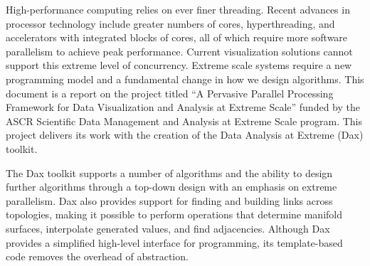 
High-performance computing relies on ever finer threading. Recent advances
in processor technology include greater numbers of cores, hyperthreading,
and accelerators with integrated blocks of cores, all of which require more
software parallelism to achieve peak performance. Current visualization
solutions cannot support this extreme level of concurrency. Extreme scale
systems require a new programming model and a fundamental change in how we
design algorithms. This document is a report on the project titled ``A
Pervasive Parallel Processing Framework for Data Visualization and Analysis
at Extreme Scale'' funded by the ASCR Scientific Data Management and
Analysis at Extreme Scale program. This project delivers its work with the
creation of the Data Analysis at Extreme (Dax) toolkit.

The Dax toolkit supports a number of algorithms and the ability to design
further algorithms through a top-down design with an emphasis on extreme
parallelism. Dax also provides support for finding and building links
across topologies, making it possible to perform operations that determine
manifold surfaces, interpolate generated values, and find
adjacencies. Although Dax provides a simplified high-level interface for
programming, its template-based code removes the overhead of abstraction.

